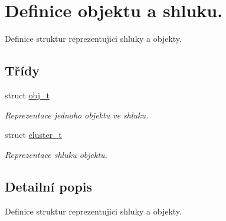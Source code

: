 \hypertarget{group__DeklaraceStruktur}{}\section{Definice objektu a shluku.}
\label{group__DeklaraceStruktur}


Definice struktur reprezentujici shluky a objekty.  


\subsection*{Třídy}
\begin{DoxyCompactItemize}
\item 
struct \hyperlink{structobj__t}{obj\+\_\+t}
\begin{DoxyCompactList}\small\item\em Reprezentace jednoho objektu ve shluku. \end{DoxyCompactList}\item 
struct \hyperlink{structcluster__t}{cluster\+\_\+t}
\begin{DoxyCompactList}\small\item\em Reprezentace shluku objektu. \end{DoxyCompactList}\end{DoxyCompactItemize}


\subsection{Detailní popis}
Definice struktur reprezentujici shluky a objekty. 

